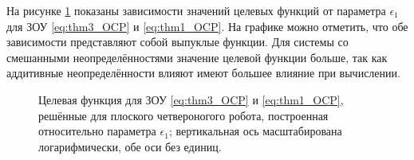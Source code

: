 На рисунке \ref{fig:additive} показаны зависимости значений целевых функций от параметра $\epsilon_1$ для ЗОУ \eqref{eq:thm3_OCP} и \eqref{eq:thm1_OCP}. На графике можно отметить, что обе зависимости представляют собой выпуклые функции. Для системы со смешанными неопределённостями значение целевой функции больше, так как аддитивные неопределённости влияют имеют большее влияние при вычислении. 
\begin{figure}[ht]
	\caption{Целевая функция для ЗОУ \eqref{eq:thm3_OCP} и \eqref{eq:thm1_OCP}, решённые для плоского четвероногого робота, построенная относительно параметра $\epsilon_1$; вертикальная ось масштабирована логарифмически, обе оси без единиц.} \label{fig:additive}
\end{figure}


